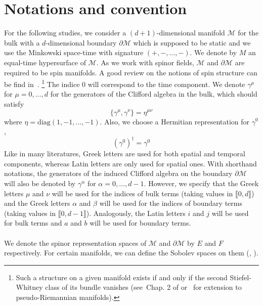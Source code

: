 \section*{Notations and convention}
For the following studies, we consider a $(d+1)$-dimensional manifold $\mathcal{M}$ for the bulk with a $d$-dimensional boundary $\partial \mathcal{M}$ which is supposed to be static and we use the Minkowski space-time with signature $(+, -,\ldots, -)$.
We denote by $M$ an equal-time hypersurface of $\mathcal{M}$.
As we work with spinor fields, $\mathcal{M}$ and $\partial \mathcal{M}$ are required to be spin manifolds. 
A good review on the notions of spin structure can be find in~\cite{Trautman2007}.
\footnote{
Such a structure on a given manifold exists if and only if the second Stiefel-Whitney class of its bundle vanishes (see~\eg Chap. 2 of \cite{Lawson1989} or~\cite{Alagia1985} for extension to pseudo-Riemannian manifolds).}
%
The indice 0 will correspond to the time component.
We denote $\gamma^\mu$ for $\mu = 0, \ldots, d$ for the generators of the Clifford algebra in the bulk, which should satisfy
\begin{equation*}
\{ \gamma^\mu, \gamma^\nu \} = \eta^{\mu\nu}
\end{equation*} 
where $\eta = \mathrm{diag}(1, -1 ,\ldots, -1)$.
Also, we choose a Hermitian representation for $\gamma^0$, 
\ie
\begin{equation*}
(\gamma^0)^\dagger = \gamma^0
\end{equation*}
Like in many literatures, Greek letters are used for both spatial and temporal components, whereas Latin letters are only used for spatial ones.
With shorthand notations, the generators of the induced Clifford algebra on the boundary $\partial \mathcal{M}$ will also be denoted by $\gamma^\alpha$ for $\alpha = 0 ,\ldots, d-1$. 
However, we specify that the Greek letters $\mu$ and $\nu$ will be used for the indices of bulk terms (taking values in $\llbracket 0, d \rrbracket$) and the Greek letters $\alpha$ and $\beta$ will be used for the indices of boundary terms (taking values in $\llbracket 0, d-1 \rrbracket$).
Analogously, the Latin letters $i $ and $j$ will be used for bulk terms and $a$ and $b$ will be used for boundary terms. \\\\
%
We denote the spinor representation spaces of $\mathcal{M}$ and $\partial \mathcal{M}$ by $E$ and $F$ respectively.
For certain manifolds, we can define the Sobolev spaces on them (\cite{Hebey1996}, \cite{Eichhorn1996}).
